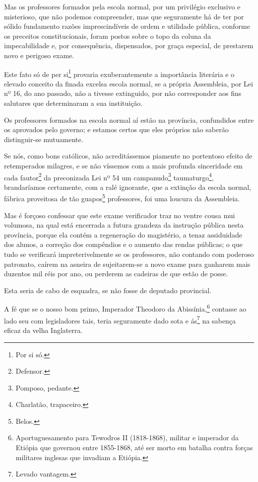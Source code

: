 Mas os professores formados pela escola normal, por um privilégio
exclusivo e misterioso, que não podemos compreender, mas que seguramente
há de ter por sólido fundamento razões imprescindíveis de ordem e
utilidade pública, conforme os preceitos constitucionais, foram postos
sobre o topo da coluna da impecabilidade e, por consequência,
dispensados, por graça especial, de prestarem novo e perigoso exame.

Este fato só de per si\footnote{Por si só.} provaria exuberantemente a
importância literária e o elevado conceito da finada excelsa escola
normal, se a própria Assembleia, por Lei nº 16, do ano passado, não a
tivesse extinguido, por não corresponder aos fins salutares que
determinaram a sua instituição.

Os professores formados na escola normal aí estão na província,
confundidos entre os aprovados pelo governo; e estamos certos que eles
próprios não saberão distinguir-se mutuamente.

Se nós, como bons católicos, não acreditássemos piamente no portentoso
efeito de retemperados milagres, e se não víssemos com a mais profunda
sinceridade em cada fautor\footnote{Defensor.} da preconizada Lei nº
54 um campanudo\footnote{Pomposo, pedante.} taumaturgo\footnote{
  Charlatão, trapaceiro.}, brandaríamos certamente, com a ralé
ignorante, que a extinção da escola normal, fábrica proveitosa de tão
guapos\footnote{Belos.} professores, foi uma loucura da Assembleia.

Mas é forçoso confessar que este exame verificador traz no ventre cousa
mui volumosa, na qual está encerrada a futura grandeza da instrução
pública nesta província, porque ela contém a regeneração do magistério,
a tenaz assiduidade dos alunos, a correção dos compêndios e o aumento
das rendas públicas; o que tudo se verificará impreterivelmente se os
professores, não contando com poderoso patronato, caírem na asneira de
sujeitarem-se a novo exame para ganharem mais duzentos mil réis por ano,
ou perderem as cadeiras de que estão de posse.

Esta seria de cabo de esquadra, se não fosse de deputado provincial.

A fé que se o nosso bom primo, Imperador Theodoro da
Abissínia,\footnote{Aportuguesamento para Tewodros II (1818-1868),
  militar e imperador da Etiópia que governou entre 1855-1868, até ser
  morto em batalha contra forças militares inglesas que invadiam a
  Etiópia.} contasse ao lado seu com legisladores tais, teria
seguramente dado sota e ás\footnote{Levado vantagem.} na sabença
eficaz da velha Inglaterra.

